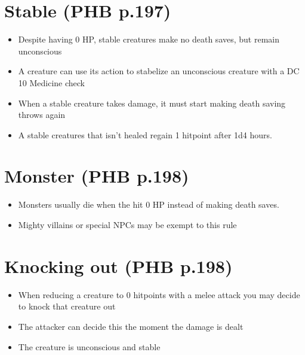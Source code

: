 \documentclass[a4paper]{article}
\begin{document}
\section{Stable \small (PHB p.197)}
\begin{itemize}
\item Despite having 0 HP, stable creatures make no death saves, but remain unconscious
\item A creature can use its action to stabelize an unconscious creature with a DC 10 Medicine check
\item When a stable creature takes damage, it must start making death saving throws again
\item A stable creatures that isn't healed regain 1 hitpoint after 1d4 hours.
\end{itemize}
\section{Monster \small (PHB p.198)}
\begin{itemize}
\item Monsters usually die when the hit 0 HP instead of making death saves.
\item Mighty villains or special NPCs may be exempt to this rule
\end{itemize}
\section{Knocking out \small (PHB p.198)}
\begin{itemize}
\item When reducing a creature to 0 hitpoints with a melee attack you may decide to knock that creature out
\item The attacker can decide this the moment the damage is dealt
\item The creature is unconscious and stable
\end{itemize}
\end{document}
